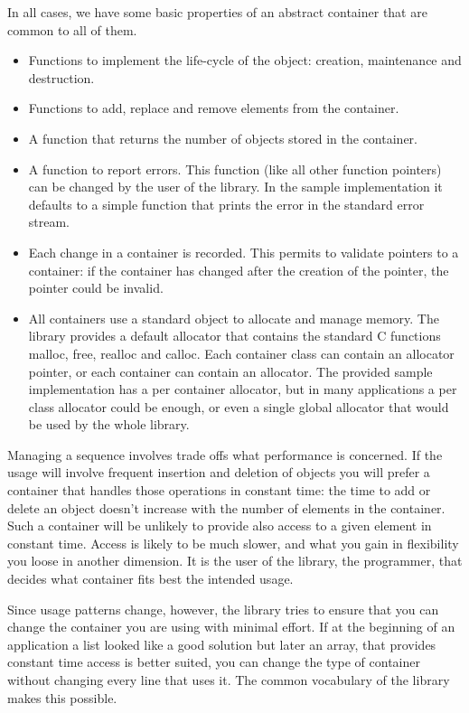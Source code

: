 \documentclass[12pt,a4paper]{memoir} %
\begin{document}
In all cases, we have some basic properties of an abstract container that are common to all of them. 
\begin{itemize}
\item Functions to implement the life-cycle of the object: creation, maintenance and destruction.
\item Functions to add, replace and remove elements from the container.
\item A function that returns the number of objects stored in the container.
\item
A function to report errors. This function (like all other function pointers) can be changed by the user of the library. In the sample implementation 
it defaults to a simple function that prints the error in the standard error stream. 
\item
Each change in a container is recorded. This permits to validate pointers to a container: if the container has changed after the creation of the pointer, the pointer could be invalid.
\item
All containers use a standard object to allocate and manage memory. The library provides a default allocator that contains the standard C functions malloc, free, realloc and calloc. Each container class can contain an allocator pointer, or each container can contain an allocator. The provided
sample implementation has a per container allocator, but in many applications a per class allocator could be enough, or even a single global allocator
that would be used by the whole library.
\end{itemize}

Managing a sequence involves trade offs what performance is concerned. If the usage will involve frequent insertion and deletion of objects you will 
prefer a container that handles those operations in constant time: the time to add or delete an object doesn't increase with the number of elements in 
the container. Such a container will be unlikely to provide also access to a given element in constant time. Access is likely to be much slower, and 
what you gain in flexibility you loose in another dimension. It is the user of the library, the programmer, that decides what container fits best the 
intended usage.

Since usage patterns change, however, the library tries to ensure that you can change the container you are using with minimal effort. If at the 
beginning of an application a list looked like a good solution but later an array, that provides constant time access is better suited, you can change 
the type of container without changing every line that uses it. The common vocabulary of the library makes this possible.
\end{document}
